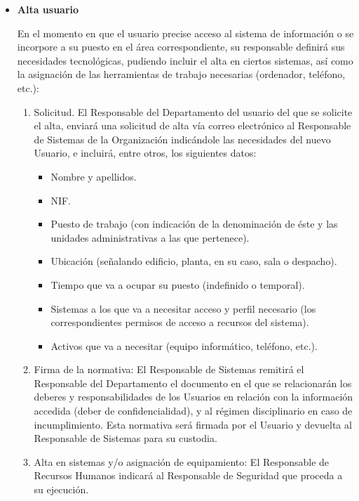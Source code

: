 \begin{enumerate}[label=\alph*)]
    \begin{itemize}
        \item \textbf{Alta usuario}

        En el momento en que el usuario precise acceso al sistema de información o se incorpore a su puesto en el área correspondiente, su responsable definirá sus necesidades tecnológicas, pudiendo incluir el alta en ciertos sistemas, así como la asignación de las herramientas de trabajo necesarias (ordenador, teléfono, etc.):

        \begin{enumerate}[label=\arabic*.]
            \item Solicitud. El Responsable del Departamento del usuario del que se solicite el alta, enviará una solicitud de alta vía correo electrónico al Responsable de Sistemas de la Organización indicándole las necesidades del nuevo Usuario, e incluirá, entre otros, los siguientes datos:
            \begin{itemize}
                \item Nombre y apellidos.
                \item NIF.
                \item Puesto de trabajo (con indicación de la denominación de éste y las unidades administrativas a las que pertenece).
                \item Ubicación (señalando edificio, planta, en su caso, sala o despacho).
                \item Tiempo que va a ocupar su puesto (indefinido o temporal).
                \item Sistemas a los que va a necesitar acceso y perfil necesario (los correspondientes permisos de acceso a recursos del sistema).
                \item Activos que va a necesitar (equipo informático, teléfono, etc.).
            \end{itemize}
            \item Firma de la normativa: El Responsable de Sistemas remitirá el Responsable del Departamento el documento en el que se relacionarán los deberes y responsabilidades de los Usuarios en relación con la información accedida (deber de confidencialidad), y al régimen disciplinario en caso de incumplimiento. Esta normativa será firmada por el Usuario y devuelta al Responsable de Sistemas para su custodia.
            \item Alta en sistemas y/o asignación de equipamiento: El Responsable de Recursos Humanos indicará al Responsable de Seguridad que proceda a su ejecución.

\end{enumerate}
\end{itemize}
\end{enumerate}

